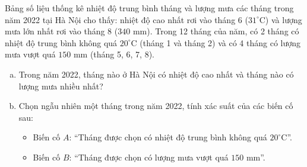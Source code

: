 \begin{bt}%
Bảng số liệu thống kê nhiệt độ trung bình tháng và lượng mưa các tháng trong năm 2022 tại Hà Nội cho thấy: nhiệt độ cao nhất rơi vào tháng 6 ($31^\circ\text{C}$) và lượng mưa lớn nhất rơi vào tháng 8 ($340\text{ mm}$). Trong 12 tháng của năm, có 2 tháng có nhiệt độ trung bình không quá $20^\circ\text{C}$ (tháng 1 và tháng 2) và có 4 tháng có lượng mưa vượt quá $150\text{ mm}$ (tháng 5, 6, 7, 8).
\begin{enumerate}[a)]
	\item Trong năm 2022, tháng nào ở Hà Nội có nhiệt độ cao nhất và tháng nào có lượng mưa nhiều nhất?
	\item Chọn ngẫu nhiên một tháng trong năm 2022, tính xác suất của các biến cố sau:
	\begin{itemize}
		\item Biến cố $A$: ``Tháng được chọn có nhiệt độ trung bình không quá $20^\circ\text{C}$''.
		\item Biến cố $B$: ``Tháng được chọn có lượng mưa vượt quá $150\text{ mm}$''.
	\end{itemize}
\end{enumerate}
\end{bt}

